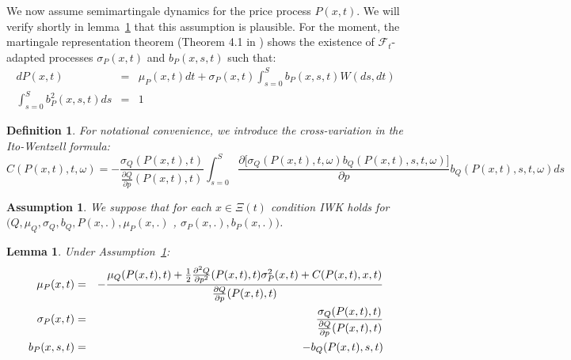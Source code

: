\documentclass{article}
\newtheorem{lemma}[theorem]{Lemma}
\newtheorem{definition}{Definition}
\newtheorem{assumption}{Assumption}
\begin{document}
\bigskip

We now assume semimartingale dynamics for the price process $P(x,t)$. We
will verify shortly in lemma~\ref{lemma::para} that this assumption is
plausible. For the moment, the martingale representation theorem (Theorem
4.1 in \cite{CT06}) shows the existence of $\mathcal{F}_{t}$-adapted
processes $\sigma _{P}(x,t)$ and $b_{P}(x,s,t)$ such that:%
\begin{eqnarray}
dP(x,t) &=&\mu _{P}(x,t)dt+\sigma
_{P}(x,t)\int_{s=0}^{S}b_{P}(x,s,t)W(ds,dt)  \label{equforP} \\
\int_{s=0}^{S}b_{P}^{2}(x,s,t)ds &=&1
\end{eqnarray}


\begin{definition}
For notational convenience, we introduce the cross-variation in the
Ito-Wentzell formula:%
\begin{equation*}
C(P(x,t),t,\omega )=-\frac{\sigma _{Q}(P(x,t),t)}{\frac{\partial Q}{\partial
p}(P(x,t),t)}\int_{s=0}^{S}\frac{\partial \lbrack \sigma
_{Q}(P(x,t),t,\omega )b_{Q}(P(x,t),s,t,\omega )]}{\partial p}%
b_{Q}(P(x,t),s,t,\omega )ds
\end{equation*}
\end{definition}


\begin{assumption}
\label{ass::iwk_condition_Q} We suppose that for each $x\in \Xi (t)$
condition IWK holds for $(Q,\mu _{Q},\sigma _{Q},b_{Q},P(x,.),\mu _{P}(x,.)$%
, $\sigma _{P}(x,.),b_{P}(x,.))$.
\end{assumption}



\begin{lemma}
\label{lemma::para} Under Assumption~\ref{ass::iwk_condition_Q}:
\begin{eqnarray}
\mu _{P}(x,t) &=&-\frac{\mu _{Q}(P(x,t),t)+\frac{1}{2}\frac{\partial ^{2}Q}{%
\partial p^{2}}(P(x,t),t)\sigma _{P}^{2}(x,t)+C(P(x,t),x,t)}{\frac{\partial Q%
}{\partial p}(P(x,t),t)}  \label{mu_Px} \\
\sigma _{P}(x,t) &=&\frac{\sigma _{Q}(P(x,t),t)}{\frac{\partial Q}{\partial p%
}(P(x,t),t)}  \label{sigma_P} \\
b_{P}(x,s,t) &=&-b_{Q}(P(x,t),s,t)  \label{b_P}
\end{eqnarray}
\end{lemma}
\end{document}
